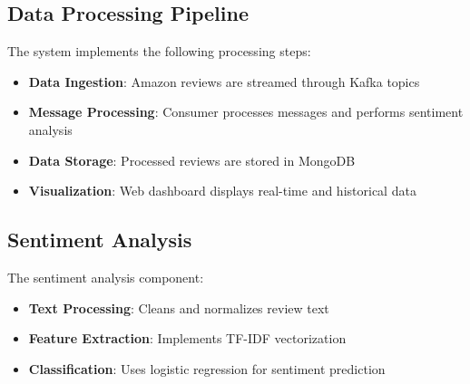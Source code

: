 \documentclass[11pt,a4paper,twocolumn]{article}
\begin{document}
\subsection{Data Processing Pipeline}
The system implements the following processing steps:
\begin{itemize}
    \item \textbf{Data Ingestion}: Amazon reviews are streamed through Kafka topics
    \item \textbf{Message Processing}: Consumer processes messages and performs sentiment analysis
    \item \textbf{Data Storage}: Processed reviews are stored in MongoDB
    \item \textbf{Visualization}: Web dashboard displays real-time and historical data
\end{itemize}

\subsection{Sentiment Analysis}
The sentiment analysis component:
\begin{itemize}
    \item \textbf{Text Processing}: Cleans and normalizes review text
    \item \textbf{Feature Extraction}: Implements TF-IDF vectorization
    \item \textbf{Classification}: Uses logistic regression for sentiment prediction
\end{itemize}
\end{document}
